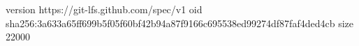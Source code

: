 version https://git-lfs.github.com/spec/v1
oid sha256:3a633a65ff699b5f05f60bf42b94a87f9166c695538ed99274df87faf4ded4cb
size 22000

